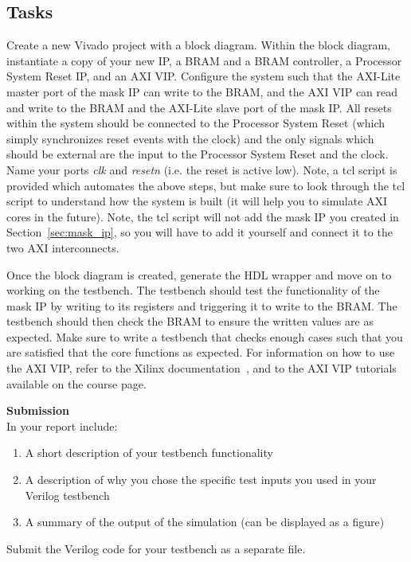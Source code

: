 \documentclass{article}
\begin{document}
\subsection{Tasks}
Create a new Vivado project with a block diagram. Within the block diagram, instantiate a copy of your new IP, a BRAM and a BRAM controller, a Processor System Reset IP, and an AXI VIP. Configure the system such that the AXI-Lite master port of the mask IP can write to the BRAM, and the AXI VIP can read and write to the BRAM and the AXI-Lite slave port of the mask IP. All resets within the system should be connected to the Processor System Reset (which simply synchronizes reset events with the clock) and the only signals which should be external are the input to the Processor System Reset and the clock. Name your ports \textit{clk} and \textit{resetn} (i.e. the reset is active low). Note, a tcl script is provided which automates the above steps, but make sure to look through the tcl script to understand how the system is built (it will help you to simulate AXI cores in the future). Note, the tcl script will not add the mask IP you created in Section~\ref{sec:mask_ip}, so you will have to add it yourself and connect it to the two AXI interconnects.

Once the block diagram is created, generate the HDL wrapper and move on to working on the testbench. The testbench should test the functionality of the mask IP by writing to its registers and triggering it to write to the BRAM. The testbench should then check the BRAM to ensure the written values are as expected. Make sure to write a testbench that checks enough cases such that you are satisfied that the core functions as expected. For information on how to use the AXI VIP, refer to the Xilinx documentation~\cite{xilinxvip}, and to the AXI VIP tutorials available on the course page.
\\

\begin{minipage}{\textwidth}
\noindent\textbf{Submission}\\
In your report include:
\begin{enumerate}
\item A short description of your testbench functionality
\item A description of why you chose the specific test inputs you used in your Verilog testbench
\item A summary of the output of the simulation (can be displayed as a figure)
\end{enumerate}
Submit the Verilog code for your testbench as a separate file.
\end{minipage}



\newpage
\printbibliography
\end{document}
